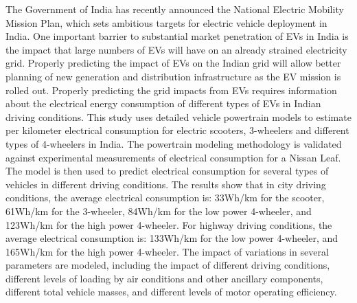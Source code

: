 The Government of India has recently announced the National Electric Mobility Mission Plan, which sets ambitious targets for electric vehicle deployment in India. One important barrier to substantial market penetration of EVs in India is the impact that large numbers of EVs will have on an already strained electricity grid. Properly predicting the impact of EVs on the Indian grid will allow better planning of new generation and distribution infrastructure as the EV mission is rolled out. Properly predicting the grid impacts from EVs requires information about the electrical energy consumption of different types of EVs in Indian driving conditions. This study uses detailed vehicle powertrain models to estimate per kilometer electrical consumption for electric scooters, 3-wheelers and different types of 4-wheelers in India. The powertrain modeling methodology is validated against experimental measurements of electrical consumption for a Nissan Leaf. The model is then used to predict electrical consumption for several types of vehicles in different driving conditions. The results show that in city driving conditions, the average electrical consumption is: 33Wh/km for the scooter, 61Wh/km for the 3-wheeler, 84Wh/km for the low power 4-wheeler, and 123Wh/km for the high power 4-wheeler. For highway driving conditions, the average electrical consumption is: 133Wh/km for the low power 4-wheeler, and 165Wh/km for the high power 4-wheeler. The impact of variations in several parameters are modeled, including the impact of different driving conditions, different levels of loading by air conditions and other ancillary components, different total vehicle masses, and different levels of motor operating efficiency.